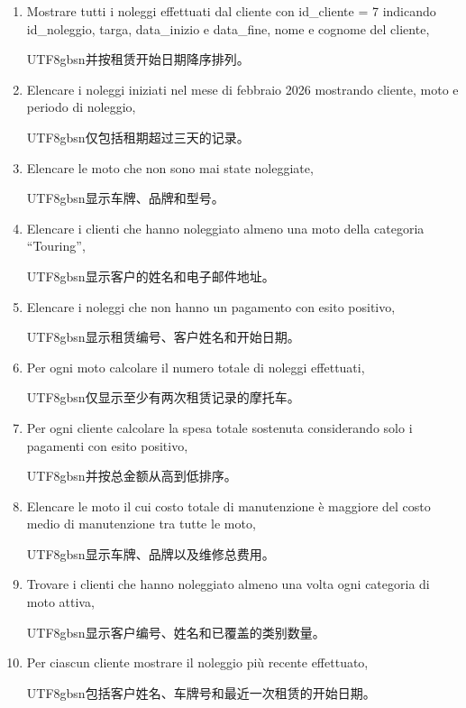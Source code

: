 \documentclass[a4paper,12pt]{article}
\begin{document}
	\begin{enumerate}
		\item Mostrare tutti i noleggi effettuati dal cliente con id\_cliente = 7 indicando id\_noleggio, targa, data\_inizio e data\_fine, nome e cognome del cliente,
		\begin{CJK}{UTF8}{gbsn}并按租赁开始日期降序排列。\end{CJK}
		
		\item Elencare i noleggi iniziati nel mese di febbraio 2026 mostrando cliente, moto e periodo di noleggio,
		\begin{CJK}{UTF8}{gbsn}仅包括租期超过三天的记录。\end{CJK}
		
		\item Elencare le moto che non sono mai state noleggiate,
		\begin{CJK}{UTF8}{gbsn}显示车牌、品牌和型号。\end{CJK}
		
		\item Elencare i clienti che hanno noleggiato almeno una moto della categoria ``Touring'',
		\begin{CJK}{UTF8}{gbsn}显示客户的姓名和电子邮件地址。\end{CJK}
		
		\item Elencare i noleggi che non hanno un pagamento con esito positivo,
		\begin{CJK}{UTF8}{gbsn}显示租赁编号、客户姓名和开始日期。\end{CJK}
		
		\item Per ogni moto calcolare il numero totale di noleggi effettuati,
		\begin{CJK}{UTF8}{gbsn}仅显示至少有两次租赁记录的摩托车。\end{CJK}
		
		\item Per ogni cliente calcolare la spesa totale sostenuta considerando solo i pagamenti con esito positivo,
		\begin{CJK}{UTF8}{gbsn}并按总金额从高到低排序。\end{CJK}
		
		\item Elencare le moto il cui costo totale di manutenzione è maggiore del costo medio di manutenzione tra tutte le moto,
		\begin{CJK}{UTF8}{gbsn}显示车牌、品牌以及维修总费用。\end{CJK}
		
		\item Trovare i clienti che hanno noleggiato almeno una volta ogni categoria di moto attiva,
		\begin{CJK}{UTF8}{gbsn}显示客户编号、姓名和已覆盖的类别数量。\end{CJK}
		
		\item Per ciascun cliente mostrare il noleggio più recente effettuato,
		\begin{CJK}{UTF8}{gbsn}包括客户姓名、车牌号和最近一次租赁的开始日期。\end{CJK}
	\end{enumerate}
	
\end{document}

